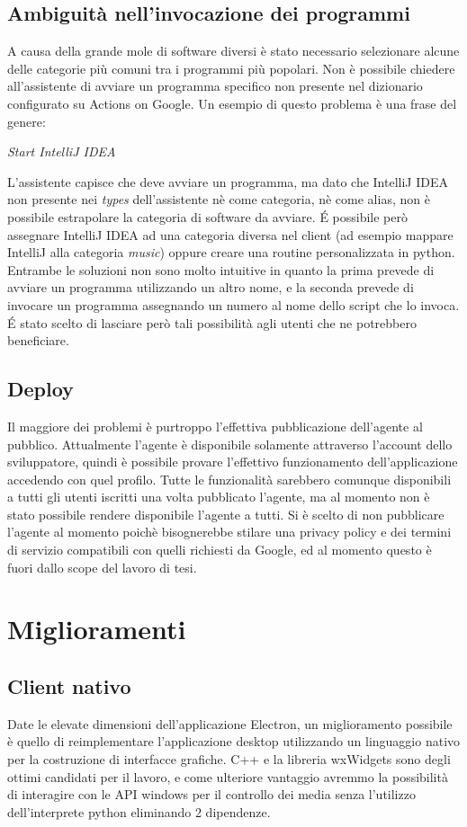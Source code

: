\subsection{Ambiguità nell'invocazione dei programmi}
A causa della grande mole di software diversi è stato necessario selezionare alcune delle categorie più comuni tra i programmi più popolari. 
Non è possibile chiedere all'assistente di avviare un programma specifico non presente nel dizionario configurato su Actions on Google. 
Un esempio di questo problema è una frase del genere:

\textit{Start IntelliJ IDEA}

L'assistente capisce che deve avviare un programma, ma dato che IntelliJ IDEA non presente nei \textit{types} dell'assistente nè come categoria, nè come alias, non è possibile estrapolare la categoria di software da avviare. 
\'E possibile però assegnare IntelliJ IDEA ad una categoria diversa nel client (ad esempio mappare IntelliJ alla categoria \textit{music}) oppure creare una routine personalizzata in python. 
Entrambe le soluzioni non sono molto intuitive in quanto la prima prevede di avviare un programma utilizzando un altro nome, e la seconda prevede di invocare un programma assegnando un numero al nome dello script che lo invoca.
\'E stato scelto di lasciare però tali possibilità agli utenti che ne potrebbero beneficiare.

\subsection{Deploy}
Il maggiore dei problemi è purtroppo l'effettiva pubblicazione dell'agente al pubblico. 
Attualmente l'agente è disponibile solamente attraverso l'account dello sviluppatore, quindi è possibile provare l'effettivo funzionamento dell'applicazione accedendo con quel profilo. 
Tutte le funzionalità sarebbero comunque disponibili a tutti gli utenti iscritti una volta pubblicato l'agente, ma al momento non è stato possibile rendere disponibile l'agente a tutti. 
Si è scelto di non pubblicare l'agente al momento poichè bisognerebbe stilare una privacy policy e dei termini di servizio compatibili con quelli richiesti da Google, ed al momento questo è fuori dallo scope del lavoro di tesi.

\section{Miglioramenti}
\subsection{Client nativo}
Date le elevate dimensioni dell'applicazione Electron, un miglioramento possibile è quello di reimplementare l'applicazione desktop utilizzando un linguaggio nativo per la costruzione di interfacce grafiche. 
C++ e la libreria wxWidgets sono degli ottimi candidati per il lavoro, e come ulteriore vantaggio avremmo la possibilità di interagire con le API windows per il controllo dei media senza l'utilizzo dell'interprete python eliminando 2 dipendenze.


